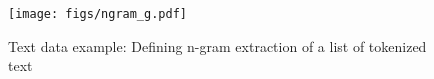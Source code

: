 \begin{figure}
    \centering
    \texttt{[image: figs/ngram\_g.pdf]}
    \vspace{-7pt}
    \caption{Text data example: Defining n-gram extraction of a list of tokenized text
    }
    \label{fig:text_accept}
    \vspace{-10pt}
\end{figure}